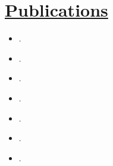 \documentclass[11pt]{article}
\begin{document}
\vspace{-10pt}
\section*{\uline{Publications\hfill}}
\vspace{-5pt}
\begin{itemize}
\item[\cite{street2023formal}] .
\item[\cite{zhang2023multi}] .
\item[\cite{street2023analysing}] .
\item[\cite{lacerda2022decision}] .
\item[\cite{street2022context}] .
\item[\cite{street2021congestion}] .	
\item[\cite{street2020multi}] .
\end{itemize}
\end{document}
